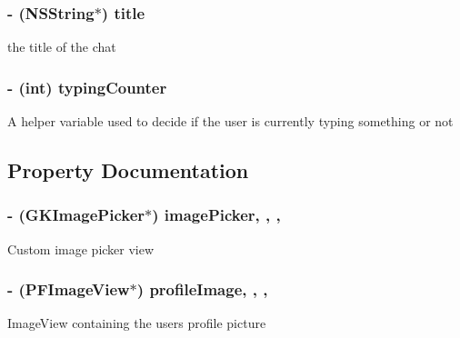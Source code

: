 \subsubsection[{title}]{\setlength{\rightskip}{0pt plus 5cm}-\/ (N\+S\+String$\ast$) title\hspace{0.3cm}{\ttfamily [protected]}}\label{category_e_s_chat_view_07_08_ab8d88592b083ac2957b18ab953fc2c31}
the title of the chat \hypertarget{category_e_s_chat_view_07_08_a3e1a290406d94af4d7974a536fdae010}{}
\subsubsection[{typing\+Counter}]{\setlength{\rightskip}{0pt plus 5cm}-\/ (int) typing\+Counter\hspace{0.3cm}{\ttfamily [protected]}}\label{category_e_s_chat_view_07_08_a3e1a290406d94af4d7974a536fdae010}
A helper variable used to decide if the user is currently typing something or not 

\subsection{Property Documentation}
\hypertarget{category_e_s_chat_view_07_08_a735277762079544c5eae6640a3b235eb}{}
\subsubsection[{image\+Picker}]{\setlength{\rightskip}{0pt plus 5cm}-\/ ({\bf G\+K\+Image\+Picker}$\ast$) image\+Picker\hspace{0.3cm}{\ttfamily [read]}, {\ttfamily [write]}, {\ttfamily [nonatomic]}, {\ttfamily [strong]}}\label{category_e_s_chat_view_07_08_a735277762079544c5eae6640a3b235eb}
Custom image picker view \hypertarget{category_e_s_chat_view_07_08_ae3aef282d138342e0435a36d87ff7cdf}{}
\subsubsection[{profile\+Image}]{\setlength{\rightskip}{0pt plus 5cm}-\/ (P\+F\+Image\+View$\ast$) profile\+Image\hspace{0.3cm}{\ttfamily [read]}, {\ttfamily [write]}, {\ttfamily [nonatomic]}, {\ttfamily [strong]}}\label{category_e_s_chat_view_07_08_ae3aef282d138342e0435a36d87ff7cdf}
Image\+View containing the user\textquotesingle{}s profile picture \hypertarget{category_e_s_chat_view_07_08_a25a71b1a985e2393e255845bed75a80a}{}
